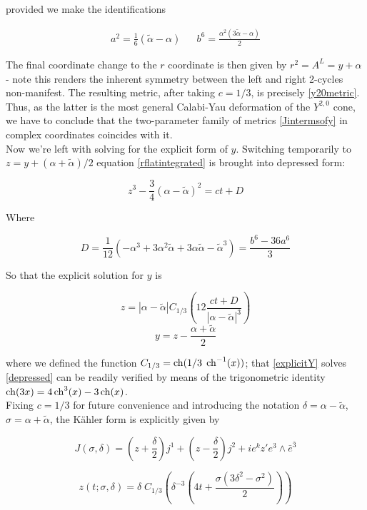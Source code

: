 provided we make the identifications

\begin{align}
	a^2 = \frac{1}{6}(\tilde{\alpha} - \alpha) && b^6 = \frac{\alpha^{2}(3\tilde{\alpha}-\alpha)}2
	\label{<++>}
\end{align}

The final coordinate change to the $r$ coordinate is then given by $r^2 = A^L = y + \alpha$ - note this renders the inherent symmetry between the left and right 2-cycles non-manifest. The resulting metric, after taking $c=1/3$, is precisely \ref{y20metric}. Thus, as the latter is the most general Calabi-Yau deformation of the $Y^{2,0}$ cone, we have to conclude that the two-parameter family of metrics \ref{Jintermsofy} in complex coordinates coincides with it.\\

Now we're left with solving for the explicit form of $y$. Switching temporarily to $z = y + (\alpha + \tilde\alpha)/2$ equation \ref{rflatintegrated} is brought into depressed form:

\begin{equation}
	z^3 - \frac{3}4 (\alpha - \tilde\alpha)^2 = ct + D
	\label{depressed}
\end{equation}

Where

\begin{equation}
	D = \frac{1}{12}(-\alpha^3 + 3 \alpha^2 \tilde\alpha + 3 \alpha\tilde{\alpha} - \tilde{\alpha}^3) = \frac{b^6-36a^6}{3}
	\label{dprime}
\end{equation}

So that the explicit solution for $y$ is

\begin{equation}
	z = |\alpha - \tilde \alpha| C_{1/3} \left( 12 \frac{ct + D}{|\alpha-\tilde\alpha|^3} \right) 
	\label{explicitz}
\end{equation}
\begin{equation}
	y = z - \frac{\alpha + \tilde{\alpha}}2
	\label{explicitY}
\end{equation}

where we defined the function $C_{1/3} = \operatorname{ch}(1/3 \; \operatorname{ch}^{-1}(x))$; that \ref{explicitY} solves \ref{depressed} can be readily verified by means of the trigonometric identity $\operatorname{ch}(3x) = 4 \operatorname{ch}^3(x) - 3 \operatorname{ch}(x)$.\\

Fixing $c=1/3$ for future convenience and introducing the notation $\delta = \alpha - \tilde{\alpha}$, $\sigma = \alpha + \tilde{\alpha}$, the K\"ahler form is explicitly given by

\begin{equation}
	J(\sigma,\delta) = \left(  z + \frac{\delta}{2}\right) j^1 + \left(z-\frac{\delta}{2}\right) j^2 + ie^k z' e^3 \wedge \bar e^{\bar 3}
	\label{}
\end{equation}

\begin{equation}
	z(t;\sigma,\delta) = \delta \;C_{1/3} \left( \delta^{-3} \left( 4t + \frac{\sigma(3\delta^2 - \sigma^2)}{2} \right) \right)
	\label{}
\end{equation}


